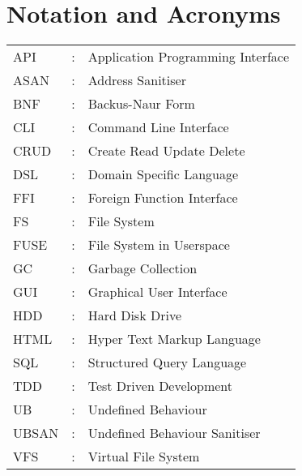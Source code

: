 \chapter*{Notation and Acronyms}
\vspace{1cm}

\noindent
\begin{tabular}{lcl}
    API &: & Application Programming Interface \\
    ASAN &: & Address Sanitiser \\
    BNF &: & Backus-Naur Form \\
    CLI &: & Command Line Interface \\
    CRUD &: & Create Read Update Delete \\
    DSL &: & Domain Specific Language \\
    FFI &: & Foreign Function Interface \\
    FS &: & File System \\
    FUSE &: & File System in Userspace \\
    GC &: & Garbage Collection \\
    GUI &: & Graphical User Interface \\
    HDD &: & Hard Disk Drive \\
    HTML &: & Hyper Text Markup Language \\
    SQL &: & Structured Query Language \\
    TDD &: & Test Driven Development \\
    UB &: & Undefined Behaviour \\
    UBSAN &: & Undefined Behaviour Sanitiser \\
    VFS &: & Virtual File System \\
\end{tabular}
